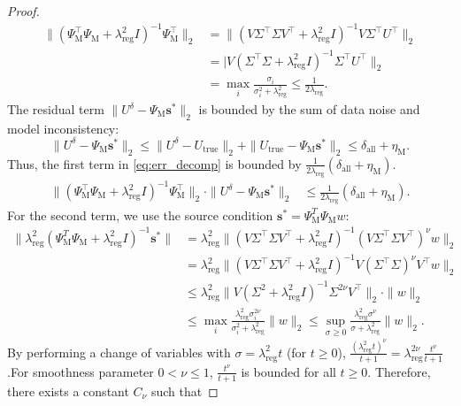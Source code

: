 \documentclass{article}
\theoremstyle{plain}
\theoremstyle{definition}
\begin{document}
{\begin{proof}
\begin{align*}
\|(\Psi_\text{M}^\top\Psi_\text{M}+\lambda_{\text{reg}}^2 I)^{-1}\Psi_\text{M}^\top\|_2& =\|(V\Sigma^\top\Sigma V^\top+ \lambda_{\text{reg}}^2 I)^{-1} V\Sigma^\top U^\top\|_2 \\
&=|V(\Sigma^\top\Sigma + \lambda_{\text{reg}}^2 I)^{-1}\Sigma^\top U^\top\|_2  \\
&= \max_i \frac{\sigma_i}{\sigma_i^2 + \lambda_{\text{reg}}^2} \le \frac{1}{2\lambda_{\text{reg}}}.
\end{align*}
The residual term $\|U^{\delta} - \Psi_\text{M} \boldsymbol{s}^{*}\|_2$ is bounded by the sum of data noise and model inconsistency: 
$$\|U^{\delta} - \Psi_\text{M} \boldsymbol{s}^{*}\|_2 \le \|U^{\delta} - U_{\text{true}}\|_2 + \|U_{\text{true}} - \Psi_\text{M} \boldsymbol{s}^{*}\|_2 \le \delta_{\text{all}} + \eta_\text{M}.$$
Thus,  the first term in \eqref{eq:err_decomp} is bounded by $\frac{1}{2\lambda_{\text{reg}}}(\delta_{\text{all}} + \eta_\text{M})$.
\begin{align*}
   \|(\Psi_\text{M}^\top\Psi_\text{M}+\lambda_{\text{reg}}^2 I)^{-1}\Psi_\text{M}^\top\|_2\cdot \|U^{\delta}-\Psi_\text{M}\boldsymbol{s}^{*}\|_2&\leq \frac{1}{2 \lambda_{\text{reg}}} (\delta_{\text{all}} + \eta_\text{M}).
\end{align*}
For the second term,  we use the source condition $\boldsymbol{s}^{*}=\Psi_\text{M}^{T}\Psi_\text{M}w$: 
\begin{align*}
   \|\lambda_{\text{reg}}^2 (\Psi_\text{M}^T\Psi_\text{M}+\lambda_{\text{reg}}^2 I)^{-1} \boldsymbol{s}^{*}\|&=\lambda_{\text{reg}}^2\|(V\Sigma^\top\Sigma V^\top+ \lambda_{\text{reg}}^2 I)^{-1} (V\Sigma^\top \Sigma V^\top)^{\nu}w\|_2\\
   &=\lambda_{\text{reg}}^2\|(V\Sigma^\top\Sigma V^\top+ \lambda_{\text{reg}}^2 I)^{-1} V(\Sigma^\top \Sigma )^{\nu}V^\top w\|_2\\
   &\leq \lambda_{\text{reg}}^2\|V(\Sigma^2+\lambda_{\text{reg}}^2 I)^{-1}\Sigma^{2\nu}V^\top\|_2\cdot\| w\|_2\\
   &\leq \max_i \frac{\lambda_{\text{reg}}^2 \sigma_i^{2\nu}}{\sigma_i^2+\lambda_{\text{reg}}^2}\|w\|_2\le \sup_{\sigma\ge0} \frac{\lambda_{\text{reg}}^2 \sigma^{\nu}}{\sigma+\lambda_{\text{reg}}^2}\|w\|_2.
\end{align*}
 By performing a change of variables with $\sigma = \lambda_{\text{reg}}^2 t$ (for $t \ge 0$),  $\frac{(\lambda_{\text{reg}}^2 t)^{\nu}}{t + 1} = \lambda_{\text{reg}}^{2\nu}  \frac{t^{\nu}}{t+1}$.For smoothness parameter $0 < \nu \le 1$,  $\frac{t^{\nu}}{t+1}$ is bounded for all $t \ge 0$. Therefore,  there exists a constant  $C_{\nu}$ such that

\end{proof}}
\end{document}
